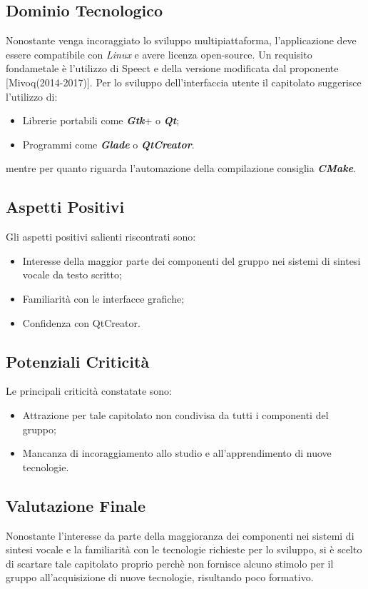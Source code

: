 \subsection{Dominio Tecnologico}
	Nonostante venga incoraggiato lo sviluppo multipiattaforma, l'applicazione deve essere compatibile con \textit{Linux} e avere licenza open-source. Un requisito fondametale è l'utilizzo di Speect e della versione modificata dal proponente [Mivoq(2014-2017)].
	\newline \newline Per lo sviluppo dell'interfaccia utente il capitolato suggerisce l'utilizzo di:
	\begin{itemize}
		\item Librerie portabili come \textit{\textbf{Gtk}}+ o \textit{\textbf{Qt}};
		\item Programmi come \textit{\textbf{Glade}} o \textit{\textbf{QtCreator}}.
	\end{itemize}
	mentre per quanto riguarda l'automazione della compilazione consiglia \textit{\textbf{CMake}}.
	
\subsection{Aspetti Positivi}
	Gli aspetti positivi salienti riscontrati sono:
	\begin{itemize}
		\item Interesse della maggior parte dei componenti del gruppo nei sistemi di sintesi vocale da testo scritto;
		\item Familiarità con le interfacce grafiche;
		\item Confidenza con QtCreator.
	\end{itemize}
	
\subsection{Potenziali Criticità}
	Le principali criticità constatate sono:
	\begin{itemize}
		\item Attrazione per tale capitolato non condivisa da tutti i componenti del gruppo;
		\item Mancanza di incoraggiamento allo studio e all'apprendimento di nuove tecnologie.
	\end{itemize}

\subsection{Valutazione Finale}
	Nonostante l'interesse da parte della maggioranza dei componenti nei sistemi di sintesi vocale e la familiarità con le tecnologie richieste per lo sviluppo, si è scelto di scartare tale capitolato proprio perchè non fornisce alcuno stimolo per il gruppo all'acquisizione di nuove tecnologie, risultando poco formativo.